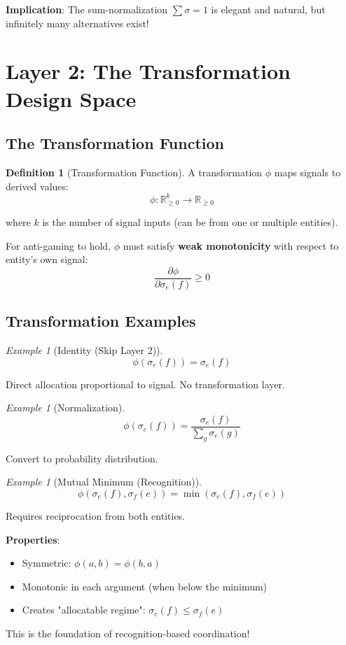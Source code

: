\documentclass[11pt,a4paper]{article}
\theoremstyle{definition}
\newtheorem{definition}[theorem]{Definition}
\theoremstyle{remark}
\newtheorem{example}[theorem]{Example}
\begin{document}
\textbf{Implication}: The sum-normalization $\sum \sigma = 1$ is elegant and natural, but infinitely many alternatives exist!

\section{Layer 2: The Transformation Design Space}

\subsection{The Transformation Function}

\begin{definition}[Transformation Function]
A transformation $\phi$ maps signals to derived values:
\[ \phi: \mathbb{R}_{\ge 0}^k \to \mathbb{R}_{\ge 0} \]

where $k$ is the number of signal inputs (can be from one or multiple entities).

For anti-gaming to hold, $\phi$ must satisfy \textbf{weak monotonicity} with respect to entity's own signal:
\[ \frac{\partial \phi}{\partial \sigma_e(f)} \ge 0 \]
\end{definition}

\subsection{Transformation Examples}

\begin{example}[Identity (Skip Layer 2)]
\[ \phi(\sigma_e(f)) = \sigma_e(f) \]

Direct allocation proportional to signal. No transformation layer.
\end{example}

\begin{example}[Normalization]
\[ \phi(\sigma_e(f)) = \frac{\sigma_e(f)}{\sum_g \sigma_e(g)} \]

Convert to probability distribution.
\end{example}

\begin{example}[Mutual Minimum (Recognition)]
\[ \phi(\sigma_e(f), \sigma_f(e)) = \min(\sigma_e(f), \sigma_f(e)) \]

Requires reciprocation from both entities.

\textbf{Properties}:
\begin{itemize}
\item Symmetric: $\phi(a,b) = \phi(b,a)$
\item Monotonic in each argument (when below the minimum)
\item Creates "allocatable regime": $\sigma_e(f) \le \sigma_f(e)$
\end{itemize}

This is the foundation of recognition-based coordination!
\end{example}
\end{document}
